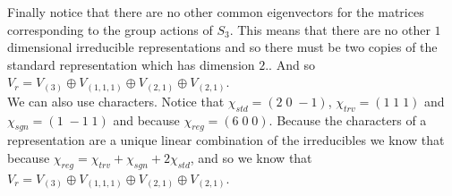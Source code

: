 \documentclass[12pt]{amsart}
\theoremstyle{definition}
\begin{document}
\begin{itemize}
Finally notice that there are no other common eigenvectors for the matrices corresponding to the group actions of $S_3$. This means that there are no other $1$ dimensional irreducible representations and so there must be two copies of the standard representation which has dimension $2$.. And so $V_r=V_{(3)}\oplus V_{(1,1,1)}\oplus V_{(2,1)}\oplus V_{(2,1)}$.\\

We can also use characters. Notice that $\chi_{std}=(2\; 0\; -1)$, $\chi_{trv}=(1\; 1\; 1)$ and $\chi_{sgn}=(1\; -1\; 1)$ and because $\chi_{reg}=(6\; 0\; 0)$. Because the characters of a representation are a unique linear combination of the irreducibles we know that because $\chi_{reg}=\chi_{trv}+\chi_{sgn}+2\chi_{std}$, and so we know that $V_r=V_{(3)}\oplus V_{(1,1,1)}\oplus V_{(2,1)}\oplus V_{(2,1)}$.
\end{itemize}
\end{document}
